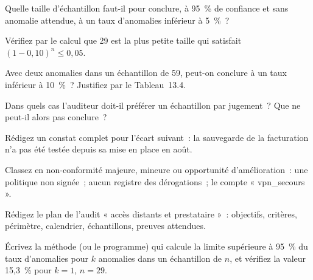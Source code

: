 \begin{boxexo}[title={\ding{45}\quad Exercice~13.3. Taille \niveaubase}]
Quelle taille d'échantillon faut-il pour conclure, à 95~\% de confiance et
sans anomalie attendue, à un taux d'anomalies inférieur à 5~\%~?
\end{boxexo}

\begin{boxexo}[title={\ding{45}\quad Exercice~13.4. La formule \niveaumoyen}]
Vérifiez par le calcul que 29 est la plus petite taille qui satisfait
$(1 - 0{,}10)^n \le 0{,}05$.
\end{boxexo}

\begin{boxexo}[title={\ding{45}\quad Exercice~13.5. Lire la limite \niveaumoyen}]
Avec deux anomalies dans un échantillon de 59, peut-on conclure à un taux
inférieur à 10~\%~? Justifiez par le Tableau~13.4.
\end{boxexo}

\begin{boxexo}[title={\ding{45}\quad Exercice~13.6. Par jugement \niveaumoyen}]
Dans quels cas l'auditeur doit-il préférer un échantillon par jugement~?
Que ne peut-il alors pas conclure~?
\end{boxexo}

\begin{boxexo}[title={\ding{45}\quad Exercice~13.7. Le constat \niveaumoyen}]
Rédigez un constat complet pour l'écart suivant~: la sauvegarde de la
facturation n'a pas été testée depuis sa mise en place en août.
\end{boxexo}

\begin{boxexo}[title={\ding{45}\quad Exercice~13.8. Majeure ou mineure \niveaumoyen}]
Classez en non-conformité majeure, mineure ou opportunité
d'amélioration~: une politique non signée~; aucun registre des dérogations~;
le compte « vpn\_secours ».
\end{boxexo}

\begin{boxexo}[title={\ding{45}\quad Exercice~13.9. Le plan d'audit \niveauexpert}]
Rédigez le plan de l'audit « accès distants et prestataire »~: objectifs,
critères, périmètre, calendrier, échantillons, preuves attendues.
\end{boxexo}

\begin{boxexo}[title={\ding{45}\quad Exercice~13.10. Calculer une limite \niveauexpert}]
Écrivez la méthode (ou le programme) qui calcule la limite supérieure à
95~\% du taux d'anomalies pour $k$ anomalies dans un échantillon de $n$,
et vérifiez la valeur 15,3~\% pour $k=1$, $n=29$.
\end{boxexo}

